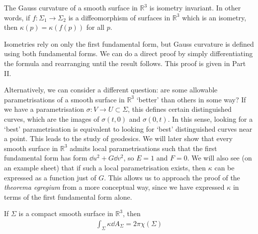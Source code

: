 \begin{theorem}
	The Gauss curvature of a smooth surface in $\mathbb R^3$ is isometry invariant.
	In other words, if $f \colon \Sigma_1 \to \Sigma_2$ is a diffeomorphism of surfaces in $\mathbb R^3$ which is an isometry, then $\kappa(p) = \kappa(f(p))$ for all $p$.
\end{theorem}
\begin{remark}
	Isometries rely on only the first fundamental form, but Gauss curvature is defined using both fundamental forms.
	We can do a direct proof by simply differentiating the formula and rearranging until the result follows.
	This proof is given in Part II.

	Alternatively, we can consider a different question: are some allowable parametrisations of a smooth surface in $\mathbb R^3$ `better' than others in some way?
	If we have a parametrisation $\sigma \colon V \to U \subset \Sigma$, this defines certain distinguished curves, which are the images of $\sigma(t,0)$ and $\sigma(0,t)$.
	In this sense, looking for a `best' parametrisation is equivalent to looking for `best' distinguished curves near a point.
	This leads to the study of geodesics.
	We will later show that every smooth surface in $\mathbb R^3$ admits local parametrisations such that the first fundamental form has form $\dd{u}^2 + G \dd{v}^2$, so $E = 1$ and $F = 0$.
	We will also see (on an example sheet) that if such a local parametrisation exists, then $\kappa$ can be expressed as a function just of $G$.
	This allows us to approach the proof of the \textit{theorema egregium} from a more conceptual way, since we have expressed $\kappa$ in terms of the first fundamental form alone.
\end{remark}
\begin{theorem}
	If $\Sigma$ is a compact smooth surface in $\mathbb R^3$, then
	\begin{align*}
		\int_\Sigma \kappa \dd{A_\Sigma} = 2 \pi \chi(\Sigma)
	\end{align*}
\end{theorem}

